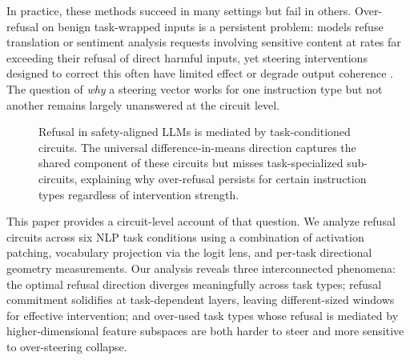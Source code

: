 \documentclass[11pt]{article}
\begin{document}
In practice, these methods succeed in many settings but fail in others. Over-refusal on benign task-wrapped inputs is a persistent problem: models refuse translation or sentiment analysis requests involving sensitive content at rates far exceeding their refusal of direct harmful inputs, yet steering interventions designed to correct this often have limited effect or degrade output coherence \citep{safeconstellations2025,braun2025unreliability}. The question of \emph{why} a steering vector works for one instruction type but not another remains largely unanswered at the circuit level.

\begin{figure}[t]
  \centering
  \caption{Refusal in safety-aligned LLMs is mediated by task-conditioned circuits. The universal difference-in-means direction captures the shared component of these circuits but misses task-specialized sub-circuits, explaining why over-refusal persists for certain instruction types regardless of intervention strength.}
  \label{fig:overview}
\end{figure}

This paper provides a circuit-level account of that question. We analyze refusal circuits across six NLP task conditions using a combination of activation patching, vocabulary projection via the logit lens, and per-task directional geometry measurements. Our analysis reveals three interconnected phenomena: the optimal refusal direction diverges meaningfully across task types; refusal commitment solidifies at task-dependent layers, leaving different-sized windows for effective intervention; and over-used task types whose refusal is mediated by higher-dimensional feature subspaces are both harder to steer and more sensitive to over-steering collapse.
\end{document}
